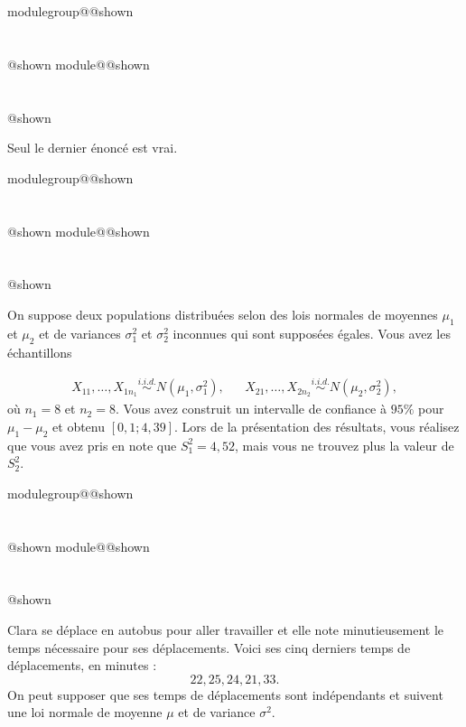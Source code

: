 \documentclass{Evaluation}
\makeatletter
\newcommand{\currentmodulekey}{}
\newcommand{\currentmoduletitle}{}
\newcommand{\currentgroupkey}{}
\newcommand{\currentgrouptitle}{}
\newcommand{\showmoduleifneeded}{%
  \ifx\currentgroupkey\empty\else
    \expandafter\ifx\csname modulegroup@\currentgroupkey @shown\endcsname\relax
      \section*{\currentgrouptitle}%
      \expandafter\gdef\csname modulegroup@\currentgroupkey @shown\endcsname{1}%
    \fi
  \fi
  \expandafter\ifx\csname module@\currentmodulekey @shown\endcsname\relax
    \section*{\currentmoduletitle}%
    \expandafter\gdef\csname module@\currentmodulekey @shown\endcsname{1}%
  \fi
}
\newenvironment{A22}{\showmoduleifneeded}{}
\makeatother
\begin{document}
\begin{questions}
\begin{A22}
\begin{solution}
Seul le dernier énoncé est vrai. 
\end{solution}
\end{A22}

\begin{A22}
\question {} %
On suppose deux populations distribuées selon des lois normales de moyennes $\mu_1$ et $\mu_2$ et de variances $\sigma^2_1$ et $\sigma^2_2$ inconnues qui sont supposées égales. Vous avez les échantillons

\begin{align*}
X_{11}, \ldots, X_{1n_1} \overset{i.i.d.}{\sim} N(\mu_1, \sigma^2_1), & & X_{21}, \ldots, X_{2n_2} \overset{i.i.d.}{\sim} N(\mu_2, \sigma^2_2),
\end{align*}
où $n_1=8$ et $n_2=8$. Vous avez construit un intervalle de confiance à $95\%$ pour $\mu_1-\mu_2$ et obtenu $[0,1; 4,39]$. Lors de la présentation des résultats, vous réalisez que vous avez pris en note que $S^2_1=4,52$, mais vous ne trouvez plus la valeur de $S^2_2$. 

\begin{solution}
    
\end{solution}
\end{A22}

\begin{A22}
\question {} %
Clara se déplace en autobus pour aller travailler et elle note minutieusement le temps nécessaire pour ses déplacements. Voici ses cinq derniers temps de déplacements, en minutes : 
$$ 22, 25, 24, 21, 33.$$
On peut supposer que ses temps de déplacements sont indépendants et suivent une loi normale de moyenne $\mu$ et de variance $\sigma^2$.

\begin{parts}
\part[6]


\end{parts}
\end{A22}
\end{questions}
\end{document}
